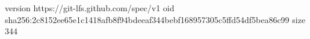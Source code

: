 version https://git-lfs.github.com/spec/v1
oid sha256:2c8152ee65e1c1418afb8f94bdeeaf344bebf168957305c5ffd54df5bea86c99
size 344
